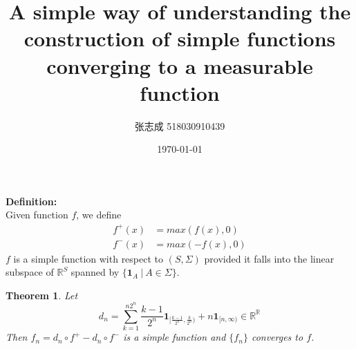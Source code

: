 \documentclass[UTF8, 12pt]{article}
\title{A simple way of understanding the construction of simple functions converging to a measurable function}
\author{张志成 518030910439}
\date{\today}
\newenvironment{definition}{\noindent\ignorespaces\textbf{Definition:}}{\hfill \noindent}
\newtheorem*{theorem*}{Theorem}
\begin{document}
    \maketitle
    \begin{definition} \\
        Given function $f$, we define
        \begin{align*}
            f^+(x) &= max(f(x), 0) \\
            f^-(x) &= max(-f(x), 0)
        \end{align*}
        $f$ is a simple function with respect to $(S,\Sigma)$ provided it falls into the linear subspace
        of $\mathbb{R}^S$ spanned by $\{\textbf{1}_A\ |\ A \in \Sigma \}$. 
    \end{definition}
    \begin{theorem*}
        Let $$ d_n = \sum_{k=1}^{n2^n} \frac{k-1}{2^n}\textbf{1}_{[\frac{k-1}{2^n}, \frac{k}{2^n})} + n\textbf{1}_{[n,\infty)} \in \mathbb{R}^\mathbb{R} $$
        Then $f_n = d_n \circ f^+ - d_n \circ f^-$ is a simple function and $\{f_n\}$ converges to $f$.
    \end{theorem*}
\end{document}
